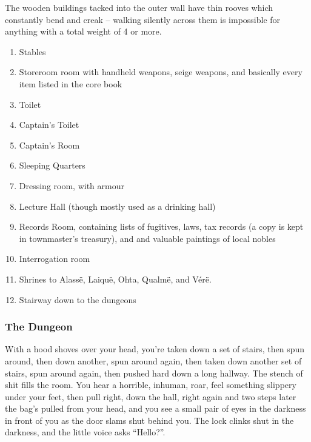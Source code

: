 The wooden buildings tacked into the outer wall have thin rooves which constantly bend and creak -- walking silently across them is impossible for anything with a total weight of 4 or more.


\begin{enumerate}

	\item{Stables}
	\item{Storeroom room with handheld weapons, seige weapons, and basically every item listed in the core book}
	\item{Toilet}
	\item{Captain's Toilet}
	\item{Captain's Room}
	\item{Sleeping Quarters}
	\item{Dressing room, with armour}
	\item{Lecture Hall (though mostly used as a drinking hall)}
	\item{Records Room, containing lists of fugitives, laws, tax records (a copy is kept in \gls{townmaster}'s treasury), and and valuable paintings of local nobles}
	\item{Interrogation room}
	\item{Shrines to Alass\"{e}, Laiqu\"{e}, Ohta, Qualm\"{e}, and V\'{e}r\"{e}.}
	\item{Stairway down to the dungeons}
\end{enumerate}



\subsubsection{The Dungeon}

\begin{boxtext}

	With a hood shoves over your head, you're taken down a set of stairs, then spun around, then down another, spun around again, then taken down another set of stairs, spun around again, then pushed hard down a long hallway.  The stench of shit fills the room.  You hear a horrible, inhuman, roar, feel something slippery under your feet, then pull right, down the hall, right again and two steps later the bag's pulled from your head, and you see a small pair of eyes in the darkness in front of you as the door slams shut behind you.  The lock clinks shut in the darkness, and the little voice asks ``Hello?''.

\end{boxtext}

